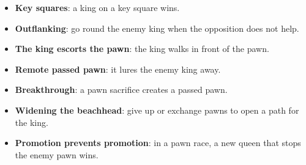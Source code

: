 \begin{itemize}
\item \textbf{Key squares}: a king on a key square wins.

\item \textbf{Outflanking}: go round the enemy king when the opposition does not help.

\item \textbf{The king escorts the pawn}: the king walks in front of the pawn.

\item \textbf{Remote passed pawn}: it lures the enemy king away.

\item \textbf{Breakthrough}: a pawn sacrifice creates a passed pawn.

\item \textbf{Widening the beachhead}: give up or exchange pawns to open a path for the king.

\item \textbf{Promotion prevents promotion}: in a pawn race, a new queen that stops the enemy pawn wins.
\end{itemize}
